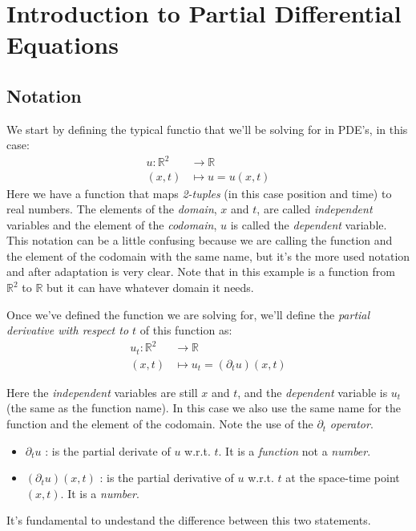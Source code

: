 \documentclass[../pde.tex]{subfiles}
\begin{document}
    \chapter{\sffamily Introduction to Partial Differential Equations}
    
    \section{\sffamily Notation}
    We start by defining the typical functio that we'll be solving for in PDE's, in this case:
    \begin{align*}
        u : \mathbb{R}^2 &\rightarrow \mathbb{R} \\
            (x,t) &\mapsto u=u(x,t) 
    \end{align*}
    Here we have a function that maps \emph{2-tuples} (in this case position and time) to real numbers. The elements of the
    \emph{domain}, $x$ and $t $,  are called \emph{independent} variables and the element of the \emph{codomain}, $u$ is called
    the \emph{dependent} variable. This notation can be a little confusing because we are calling the function and the element of
    the codomain with the same name, but it's the more used notation and after adaptation is very clear. Note that in this
    example is a function from $\mathbb{R} ^2$ to $\mathbb{R} $ but it can have whatever domain it needs.
    
    Once we've defined the function we are solving for, we'll define the \emph{partial derivative with respect to $t$} of this function as:
    \begin{align*}
        u_{t}: \mathbb{R} ^2 & \rightarrow \mathbb{R} \\
        (x,t) &\mapsto u_{t}=(\partial_{t} u)(x,t)
    \end{align*}
    
    Here the \emph{independent} variables are still $x$ and $t$, and the \emph{dependent} variable is $u_{t}$ (the same as the
    function name). In this case we also use the same name for the function and the element of the codomain. Note the use of the $\partial_{t} $
    \emph{operator}. 
    \begin{itemize}
        \item $\partial_{t} u$ : is the partial derivate of $u$ w.r.t. $t$. It is a \emph{function} not a \emph{number}.
        \item $(\partial_{t} u)(x,t)$ : is the partial derivative of $u$ w.r.t. $t$ at the space-time point $(x,t)$. It is a
            \emph{number}. 
    \end{itemize}
    It's fundamental to undestand the difference between this two statements.
    
\end{document}

